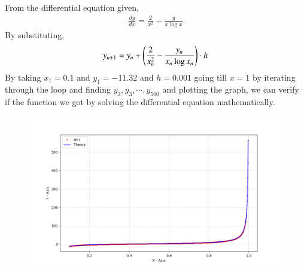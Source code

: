 \documentclass[journal]{IEEEtran}
\begin{document}
From the differential equation given,
\begin{align}
    \frac{dy}{dx}=\frac{2}{x ^ 2} -  \frac{y}{x \log x}
    \label{0.16}
\end{align}
By substituting,
\begin{align}
    y_{n+1}=y_{n}+\left(\frac{2}{x_n ^ {2}} - \frac{y_n}{x_n \log {x_n}}\right)\cdot h
\end{align}
By taking $x_1=0.1 \text{ and } y_1=-11.32$  and $h=0.001$ going till $x=1$ by iterating through the loop and finding $y_2,y_3,\cdots , y_{500}$ and plotting the graph, we can verify if the function we got by solving the differential equation mathematically.
\begin{figure}[H]
    \centering
    \includegraphics[width = \columnwidth]{figs/Figure_1.png}
\end{figure}
\end{document}
